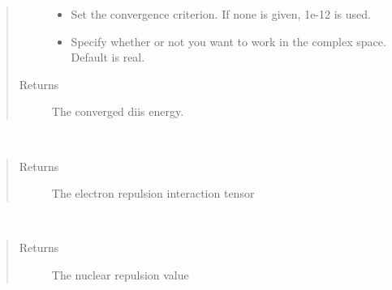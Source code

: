 \documentclass[letterpaper,10pt,english]{sphinxmanual}
\begin{document}
\begin{fulllineitems}
\begin{fulllineitems}
\begin{quote}
\begin{description}
\begin{itemize}
\item {} 
 \textendash{} Set the convergence criterion. If none is given, 1e-12 is used.

\item {} 
 \textendash{} Specify whether or not you want to work in the complex space. Default is real.

\end{itemize}

\item[{Returns}] \leavevmode
The converged diis energy.

\end{description}\end{quote}

\end{fulllineitems}


\begin{fulllineitems}
\label{\detokenize{UHF:hf.HartreeFock.UHF.MF.get_two_e}}~\begin{quote}\begin{description}
\item[{Returns}] \leavevmode
The electron repulsion interaction tensor

\end{description}\end{quote}

\end{fulllineitems}


\begin{fulllineitems}
\label{\detokenize{UHF:hf.HartreeFock.UHF.MF.nuc_rep}}~\begin{quote}\begin{description}
\item[{Returns}] \leavevmode
The nuclear repulsion value

\end{description}\end{quote}

\end{fulllineitems}


\end{fulllineitems}
\end{document}
